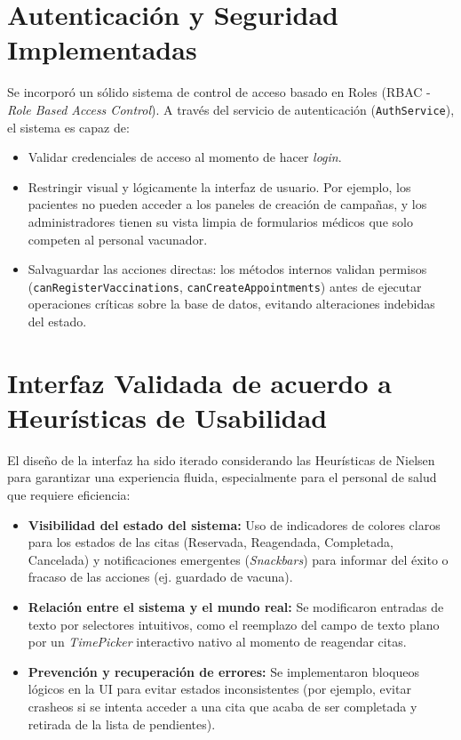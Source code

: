 \documentclass[12pt,a4paper]{article}
\begin{document}
\section{Autenticación y Seguridad Implementadas}
Se incorporó un sólido sistema de control de acceso basado en Roles (RBAC - \textit{Role Based Access Control}). 
A través del servicio de autenticación (\texttt{AuthService}), el sistema es capaz de:
\begin{itemize}
    \item Validar credenciales de acceso al momento de hacer \textit{login}.
    \item Restringir visual y lógicamente la interfaz de usuario. Por ejemplo, los pacientes no pueden acceder a los paneles de creación de campañas, y los administradores tienen su vista limpia de formularios médicos que solo competen al personal vacunador.
    \item Salvaguardar las acciones directas: los métodos internos validan permisos (\texttt{canRegisterVaccinations}, \texttt{canCreateAppointments}) antes de ejecutar operaciones críticas sobre la base de datos, evitando alteraciones indebidas del estado.
\end{itemize}

\section{Interfaz Validada de acuerdo a Heurísticas de Usabilidad}
El diseño de la interfaz ha sido iterado considerando las Heurísticas de Nielsen para garantizar una experiencia fluida, especialmente para el personal de salud que requiere eficiencia:
\begin{itemize}
    \item \textbf{Visibilidad del estado del sistema:} Uso de indicadores de colores claros para los estados de las citas (Reservada, Reagendada, Completada, Cancelada) y notificaciones emergentes (\textit{Snackbars}) para informar del éxito o fracaso de las acciones (ej. guardado de vacuna).
    \item \textbf{Relación entre el sistema y el mundo real:} Se modificaron entradas de texto por selectores intuitivos, como el reemplazo del campo de texto plano por un \textit{TimePicker} interactivo nativo al momento de reagendar citas.
    \item \textbf{Prevención y recuperación de errores:} Se implementaron bloqueos lógicos en la UI para evitar estados inconsistentes (por ejemplo, evitar crasheos si se intenta acceder a una cita que acaba de ser completada y retirada de la lista de pendientes).
\end{itemize}
\end{document}
